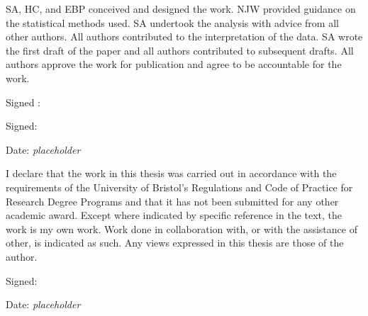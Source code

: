 \documentclass[11pt,twoside]{bristolthesis}
\begin{document}
\begin{contribution}
      \par
      
      SA, HC, and EBP conceived and designed the work. NJW provided guidance on the statistical methods used. SA undertook the analysis with advice from all other authors. All authors contributed to the interpretation of the data. SA wrote the first draft of the paper and all authors contributed to subsequent drafts. All authors approve the work for publication and agree to be accountable for the work.
      
      \par
      
      Signed :
      
      \par
      
      Signed:
      
      \par
      
      Date: \emph{placeholder}
    \end{contribution}
      \begin{declaration}
      I declare that the work in this thesis was carried out in accordance with the requirements of the University of Bristol's Regulations and Code of Practice for Research Degree Programs and that it has not been submitted for any other academic award. Except where indicated by specific reference in the text, the work is my own work. Work done in collaboration with, or with the assistance of other, is indicated as such. Any views expressed in this thesis are those of the author.
      
      \par
      
      Signed:
      
      \par
      
      Date: \emph{placeholder}
    \end{declaration}
      \hypersetup{linkcolor=black}
    \setcounter{tocdepth}{2}
    \tableofcontents
  
      \listoftables
  
\end{document}
